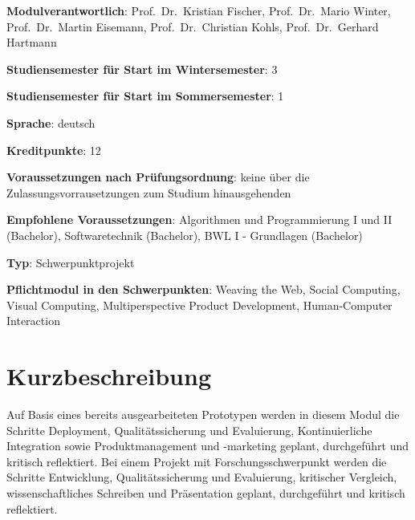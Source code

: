 \begin{modulHead}
\textbf{Modulverantwortlich}: Prof.~Dr.~Kristian
Fischer, Prof.~Dr.~Mario Winter, Prof.~Dr.~Martin Eisemann,
Prof.~Dr.~Christian Kohls, Prof.~Dr.~Gerhard
Hartmann
\end{modulHead}
\begin{modulHead}
\textbf{Studiensemester für
Start im Wintersemester}:
3
\end{modulHead}
\begin{modulHead}
\textbf{Studiensemester für Start
im Sommersemester}:
1
\end{modulHead}
\begin{modulHead}
\textbf{Sprache}:
deutsch
\end{modulHead}
\begin{modulHead}
\textbf{Kreditpunkte}:
12
\end{modulHead}
\begin{modulHead}
\textbf{Voraussetzungen nach
Prüfungsordnung}: keine über die Zulassungsvorrausetzungen zum Studium
hinausgehenden
\end{modulHead}
\begin{modulHead}
\textbf{Empfohlene
Voraussetzungen}: Algorithmen und Programmierung I und II (Bachelor),
Softwaretechnik (Bachelor), BWL I - Grundlagen
(Bachelor)
\end{modulHead}
\begin{modulHead}
\textbf{Typ}:
Schwerpunktprojekt
\end{modulHead}
\begin{modulHead}
\textbf{Pflichtmodul
in den Schwerpunkten}: Weaving the Web, Social Computing, Visual
Computing, Multiperspective Product Development, Human-Computer
Interaction
\end{modulHead}


\section*{Kurzbeschreibung\label{/mi-2017/modulbeschreibungen-master/MA_Modul_Projekt_Verwertung}}\label{kurzbeschreibungpathlabelmi-2017modulbeschreibungen-mastermaux5fmodulux5fprojektux5fverwertung}

Auf Basis eines bereits ausgearbeiteten Prototypen werden in diesem
Modul die Schritte Deployment, Qualitätssicherung und Evaluierung,
Kontinuierliche Integration sowie Produktmanagement und -marketing
geplant, durchgeführt und kritisch reflektiert. Bei einem Projekt mit
Forschungsschwerpunkt werden die Schritte Entwicklung,
Qualitätssicherung und Evaluierung, kritischer Vergleich,
wissenschaftliches Schreiben und Präsentation geplant, durchgeführt und
kritisch reflektiert.

